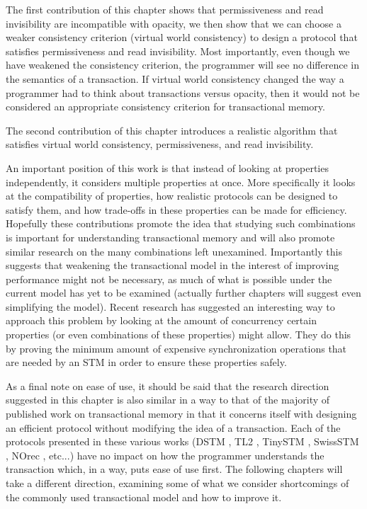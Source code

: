 The first contribution of this chapter shows that permissiveness and read invisibility are
incompatible with opacity, we then show that we can choose a weaker consistency criterion
(virtual world consistency) to design a protocol that satisfies permissiveness and
read invisibility.
Most importantly, even though we have weakened the consistency criterion, the programmer
will see no difference in the semantics of a transaction.
If virtual world consistency changed the way a programmer had to think about transactions versus opacity,
then it would not be considered an appropriate consistency criterion for transactional memory.

The second contribution of this chapter introduces a realistic algorithm that satisfies
virtual world consistency, permissiveness, and read invisibility.

An important position of this work is that instead of looking at properties independently,
it considers multiple properties at once.
More specifically it looks at the compatibility of properties, how realistic protocols can be
designed to satisfy them, and how trade-offs in these properties can be made for efficiency.
Hopefully these contributions promote the idea that studying such combinations is important for understanding
transactional memory and will also promote similar research on the many combinations
left unexamined.
Importantly this suggests that weakening the transactional model in the interest
of improving performance might not be necessary, as much of what is possible under the current
model has yet to be examined (actually further chapters will suggest even simplifying the model).
Recent research \cite{KR11} has suggested an interesting way to approach this problem by looking at the amount
of concurrency certain properties (or even combinations of these properties) might allow.
They do this by proving the minimum amount of expensive synchronization operations that are needed
by an STM in order to ensure these properties safely.

As a final note on ease of use, it should be said that the research direction suggested in
this chapter is also similar in a way to that of
the majority of published work on transactional memory in that it concerns itself with
designing an efficient protocol without modifying the idea of a transaction.
Each of the protocols presented in these various works (DSTM \cite{HLMS03}, TL2 \cite{DSS06}, TinySTM \cite{FFR08}, SwissSTM \cite{DGK09}, NOrec \cite{DSS10}, etc...) have no impact on how the programmer
understands the transaction which, in a way, puts ease of use first.
The following chapters will take a different direction, examining some of what we consider shortcomings
of the commonly used transactional model and how to improve it.

